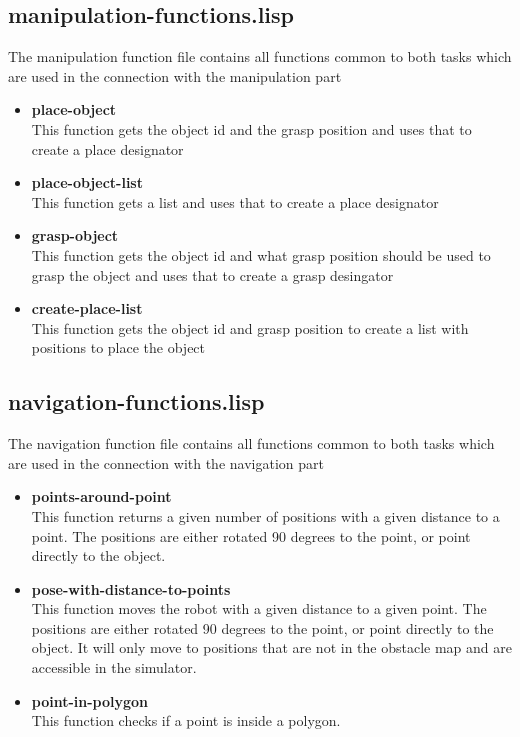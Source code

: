 \documentclass[main.tex]{subfiles}
\begin{document}
	    \subsection{manipulation-functions.lisp}
	    The manipulation function file contains all functions common to both tasks which are used in the connection with the manipulation part
	    \begin{itemize}
	    \item \textbf{place-object} \\
	    This function gets the object id and the grasp position and uses that to create a place designator  
		\item \textbf{place-object-list} \\
		This function gets a list and uses that to create a place designator 
	    \item \textbf{grasp-object} \\
	    This function gets the object id and what grasp position should be used to grasp the object and uses that to create a grasp desingator
	    \item \textbf{create-place-list} \\
	    This function gets the object id and grasp position to create a list with positions to place the object
		\end{itemize}
	    \subsection{navigation-functions.lisp}
	    The navigation function file contains all functions common to both tasks which are used in the connection with the navigation part
	    \begin{itemize}
	    	\item \textbf{points-around-point} \\
	    	This function returns a given number of positions with a given 	distance to a point. The positions are either rotated 90 degrees to the point, or point directly to the object.
	    	\item \textbf{pose-with-distance-to-points} \\
	    	This function moves the robot with a given distance to a given point. The positions are either rotated 90 degrees to the point, or point directly to the object. It will only move to positions that are not in the obstacle map and are accessible in the simulator.
	    	\item \textbf{point-in-polygon} \\
This function checks if a point is inside a polygon.
	    \end{itemize}
\end{document}
